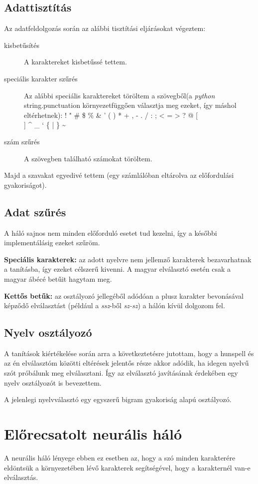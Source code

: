 \documentclass[a4paper, magyar]{article}
\begin{document}
\subsection{Adattisztítás}
Az adatfeldolgozás során az alábbi tisztítási eljárásokat végeztem:
\begin{description}
	\item[kisbetűsítés] A karaktereket kisbetűssé tettem.
	\item[speciális karakter szűrés] Az alábbi speciális karaktereket töröltem a szövegből(a \textit{python} {\selectfont
		string.punctuation%
	} környezetfüggően választja meg ezeket, így máshol eltérhetnek): ! " \# \$ \% \& ' ( ) * + , - . / : ; < = > ? @ [ \\ ] \^{} \_ ` \{ | \} \~{}
	\item[szám szűrés] A szövegben található számokat töröltem.
\end{description}

Majd a szavakat egyedivé tettem (egy számlálóban eltárolva az előfordulási gyakoriságot).
\subsection{Adat szűrés}
A háló sajnos nem minden előforduló esetet tud kezelni, így a későbbi implementálásig ezeket szűröm.

\textbf{Speciális karakterek:} az adott nyelvre nem jellemző karakterek bezavarhatnak a tanításba, így ezeket célszerű kivenni. A magyar elválasztó esetén csak a magyar ábécé betűit hagytam meg.

\textbf{Kettős betűk:} az osztályozó jellegéből adódóan a plusz karakter bevonásával képződő elválasztást (például a \textit{ssz}-ből \textit{sz-sz}) a hálón kívül dolgozom fel.
\subsection{Nyelv osztályozó}
A tanítások kiértékelése során arra a következtetésre jutottam, hogy a hunspell és az én elválasztóm közötti eltérések jelentős része akkor adódik, ha idegen nyelvű szót próbálunk meg elválasztani. Így az elválasztó javításának érdekében egy nyelv osztályozót is bevezettem.

A jelenlegi nyelvválasztó egy egyszerű bigram gyakoriság alapú osztályozó.
\section{Előrecsatolt neurális háló}
A neurális háló lényege ebben ez esetben az, hogy a szó minden karakterére eldöntsük a környezetében lévő karakterek segítségével, hogy a karakternél van-e elválasztás.
\end{document}
